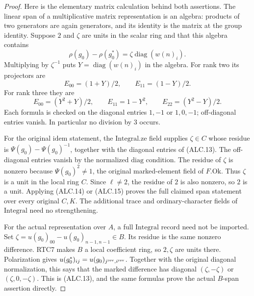 \documentclass[11pt,a4paper]{article}
\numberwithin{equation}{section}
\theoremstyle{remark}\newtheorem{remark}[theorem]{Remark}
\begin{document}
\begin{proof}
Here is the elementary matrix calculation behind both assertions.
The linear span of a multiplicative matrix representation is
an algebra: products of two generators are again generators,
and its identity is the matrix at the group identity.
Suppose \(2\) and \(\zeta\) are units in the scalar ring
and that this algebra contains
\[
 \rho(g_0)-\rho(g_0^*)
             =\zeta\operatorname{diag}(w(n)_i).
                                                        \tag{ALC.13}
\]
Multiplying by \(\zeta^{-1}\) puts
\(Y=\operatorname{diag}(w(n)_i)\) in the algebra.  For
rank two its projectors are
\[
                  E_{00}=(1+Y)/2,
                  \qquad E_{11}=(1-Y)/2.
                                                        \tag{ALC.14}
\]
For rank three they are
\[
 E_{00}=(Y^2+Y)/2,
 \qquad E_{11}=1-Y^2,
 \qquad E_{22}=(Y^2-Y)/2.
                                                        \tag{ALC.15}
\]
Each formula is checked on the diagonal entries \(1,-1\)
or \(1,0,-1\); off-diagonal entries vanish.  In particular
no division by \(3\) occurs.

For the original \(\mathrm{idem}\) statement, the
\(\mathrm{Integral.ze}\) field supplies \(\zeta\in C\)
whose residue is \(\Psi(g_0)-\Psi(g_0)^{-1}\), together
with the diagonal entries of (ALC.13).  The off-diagonal
entries vanish by the normalized \(\mathrm{diag}\) condition.
The residue of \(\zeta\) is nonzero because
\(\Psi(g_0)^2\ne1\), the original marked-element field
of \(F.\mathrm{Ok}\).  Thus \(\zeta\) is a unit in
the local ring \(C\).  Since \(\ell\ne2\), the residue
of \(2\) is also nonzero, so \(2\) is a unit.  Applying
(ALC.14) or (ALC.15) proves the full claimed span statement
over every original \(C,K\).  The additional trace and
ordinary-character fields of \(\mathrm{Integral}\) need
no strengthening.

For the actual representation over \(A\), a full
\(\mathrm{Integral}\) record need not be imported.  Set
\(\zeta=u(g_0)_{00}-u(g_0)_{n-1,n-1}\in B\).
Its residue is the same nonzero difference.  RTC7 makes
\(B\) a local coefficient ring, so \(2,\zeta\) are units
there.  Polarization gives
\(u(g_0^*)_{ij}=u(g_0)_{j^{\rm rev},i^{\rm rev}}\).
Together with the original diagonal normalization, this says
that the marked difference has diagonal \((\zeta,-\zeta)\)
or \((\zeta,0,-\zeta)\).  This is (ALC.13), and the same
formulas prove the actual \(B\)-span assertion directly.
\end{proof}
\end{document}
